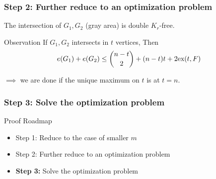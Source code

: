 \documentclass{beamer}
\newcommand*{\ex}{\textnormal{ex}}
\begin{document}
\begin{frame}
  \frametitle{Step 2: Further reduce to an optimization problem}

  \begin{center}
  \end{center}

  \pause

  The intersection of $G_1, G_2$ (gray area) is double $K_r$-free.

  \pause

  \begin{block}{Observation}
    If $G_1, G_2$ intersects in $t$ vertices, Then
    \[
      e(G_1) + e(G_2) \leq \binom{n - t}{2} + (n - t)t + 2\ex(t, F)
    \]
  \end{block}

  \pause

  \vspace{0.3cm}

  $\implies$ we are done if the unique maximum on $t$ is at $t = n$.
\end{frame}

\begin{frame}
  \frametitle{Step 3: Solve the optimization problem}

  Proof Roadmap

  \begin{itemize}
    \item Step 1: Reduce to the case of smaller $m$
    \item Step 2: Further reduce to an optimization problem
    \item \textbf{Step 3:} Solve the optimization problem
  \end{itemize}
\end{frame}
\end{document}
